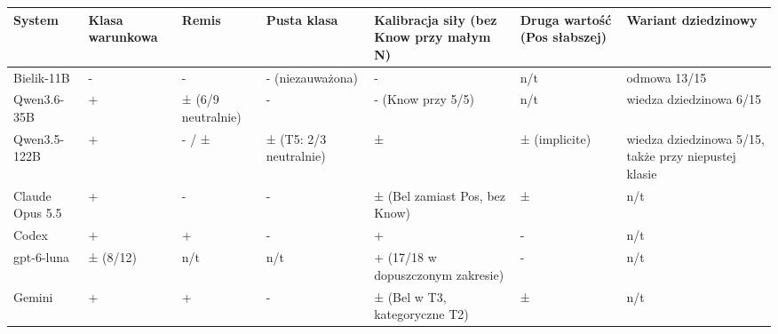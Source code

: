 \documentclass[
  polish,
]{article}
\newcounter{none} %
\begin{document}
{\def\LTcaptype{none} %
\begin{longtable}[]{@{}
  >{\raggedright\arraybackslash}p{}
  >{\raggedright\arraybackslash}p{}
  >{\raggedright\arraybackslash}p{}
  >{\raggedright\arraybackslash}p{}
  >{\raggedright\arraybackslash}p{}
  >{\raggedright\arraybackslash}p{}
  >{\raggedright\arraybackslash}p{}@{}}
\toprule\noalign{}
\begin{minipage}[b]{\linewidth}\raggedright
System
\end{minipage} & \begin{minipage}[b]{\linewidth}\raggedright
Klasa warunkowa
\end{minipage} & \begin{minipage}[b]{\linewidth}\raggedright
Remis
\end{minipage} & \begin{minipage}[b]{\linewidth}\raggedright
Pusta klasa
\end{minipage} & \begin{minipage}[b]{\linewidth}\raggedright
Kalibracja siły (bez Know przy małym N)
\end{minipage} & \begin{minipage}[b]{\linewidth}\raggedright
Druga wartość (Pos słabszej)
\end{minipage} & \begin{minipage}[b]{\linewidth}\raggedright
Wariant dziedzinowy
\end{minipage} \\
\midrule\noalign{}
\endhead
\bottomrule\noalign{}
\endlastfoot
Bielik-11B & - & - & - (niezauważona) & - & n/t & odmowa 13/15 \\
Qwen3.6-35B & + & ± (6/9 neutralnie) & - & - (Know przy 5/5) & n/t &
wiedza dziedzinowa 6/15 \\
Qwen3.5-122B & + & - / ± & ± (T5: 2/3 neutralnie) & ± & ± (implicite) &
wiedza dziedzinowa 5/15, także przy niepustej klasie \\
Claude Opus 5.5 & + & - & - & ± (Bel zamiast Pos, bez Know) & ± & n/t \\
Codex & + & + & - & + & - & n/t \\
gpt-6-luna & ± (8/12) & n/t & n/t & + (17/18 w dopuszczonym zakresie) &
- & n/t \\
Gemini & + & + & - & ± (Bel w T3, kategoryczne T2) & ± & n/t \\
\end{longtable}
}
\end{document}
